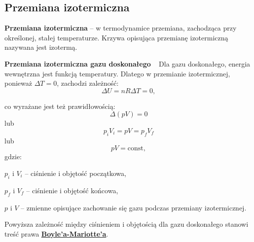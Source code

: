 \documentclass{article}
\begin{document}
\pagebreak

\subsection{Przemiana izotermiczna}

\textbf{Przemiana izotermiczna} – w termodynamice przemiana, zachodząca przy określonej, stałej temperaturze. Krzywa opisująca przemianę izotermiczną nazywana jest izotermą. ~
\vspace{2ex}

\textbf{Przemiana izotermiczna gazu doskonałego}
~
Dla gazu doskonałego, energia wewnętrzna jest funkcją temperatury. Dlatego w przemianie izotermicznej, ponieważ ${\displaystyle \Delta T=0}$, zachodzi zależność:
\begin{equation}
{\displaystyle \Delta U=nR\Delta T=0,}
\end{equation}

co wyrażane jest też prawidłowością:
\begin{equation}
{\displaystyle \Delta (pV)=0}
\end{equation}
\hspace{5ex}lub
\begin{equation}
{\displaystyle p_{i}V_{i}=pV=p_{f}V_{f}}
\end{equation}
\hspace{5ex}lub
\begin{equation}
{\displaystyle pV=\mathrm {const} ,}
\end{equation}
gdzie:
\vspace{2ex}

${\displaystyle p_{i}}$  i  ${\displaystyle V_{i}}$ – ciśnienie i objętość początkowa,
\vspace{2ex}

${\displaystyle p_{f}}$ i ${\displaystyle V_{f}}$ – ciśnienie i objętość końcowa,
\vspace{2ex}

${\displaystyle p}$  i ${\displaystyle V}$ – zmienne opisujące zachowanie się gazu podczas przemiany izotermicznej.
\vspace{2ex}

 Powyższa zależność między ciśnieniem i objętością dla gazu doskonałego stanowi treść prawa \href{https://pl.wikipedia.org/wiki/Prawo_Boyle%E2%80%99a-Mariotte%E2%80%99a}{\textbf{Boyle’a-Mariotte’a}}.~
\vspace{2ex}
\end{document}
